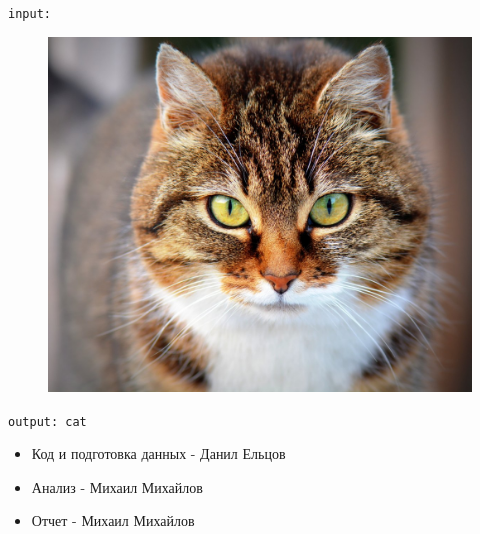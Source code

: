 \documentclass{article}
\begin{document}
\texttt{input:}
\begin{figure}[h!]
    \centering
    \includegraphics[scale=0.1]{input.png}
\end{figure}

\texttt{output: cat}


\begin{itemize}
    \item Код и подготовка данных - Данил Ельцов
    \item Анализ - Михаил Михайлов
    \item Отчет - Михаил Михайлов
\end{itemize}
\end{document}
